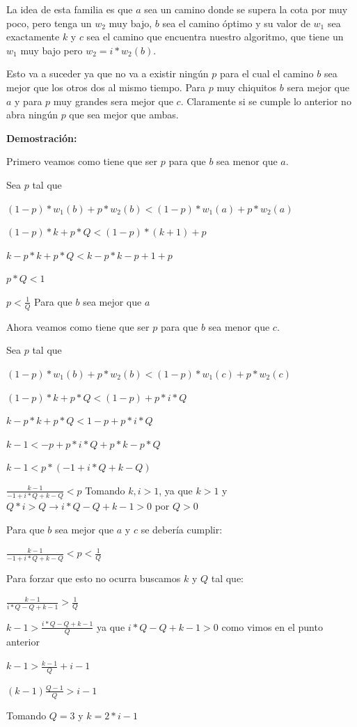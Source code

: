 La idea de esta familia es que $a$ sea un camino donde se supera la cota por muy poco, pero tenga un $w_2$ muy bajo, $b$ sea el camino óptimo y su valor de $w_1$ sea exactamente $k$ y $c$ sea el camino que encuentra nuestro algoritmo, que tiene un $w_1$ muy bajo pero $w_2 = i * w_2(b)$.

Esto va a suceder ya que no va a existir ningún $p$ para el cual el camino $b$ sea mejor que los otros dos al mismo tiempo. Para $p$ muy chiquitos $b$ sera mejor que $a$ y para $p$ muy grandes sera mejor que $c$. Claramente si se cumple lo anterior no abra ningún $p$ que sea mejor que ambas.

\textbf{Demostración:}

Primero veamos como tiene que ser $p$ para que $b$ sea menor que $a$.

Sea $p$ tal que 

$(1-p)*w_1(b)+p*w_2(b) < (1-p)*w_1(a)+p*w_2(a)$

$(1-p)*k+p*Q < (1-p)*(k+1)+p$

$k-p*k+p*Q < k-p*k-p+1+p$

$p*Q < 1$

$p < \frac{1}{Q}$ Para que $b$ sea mejor que $a$

Ahora veamos como tiene que ser $p$ para que $b$ sea menor que $c$.

Sea $p$ tal que 

$(1-p)*w_1(b)+p*w_2(b) < (1-p)*w_1(c)+p*w_2(c)$

$(1-p)*k+p*Q < (1-p)+p*i*Q$

$k-p*k+p*Q < 1-p+p*i*Q$

$k-1 < -p+p*i*Q+p*k-p*Q$

$k-1 < p*(-1+i*Q+k-Q)$

$\frac{k-1}{-1+i*Q+k-Q} < p$ Tomando $k,i > 1$, ya que $k > 1$ y $Q*i > Q \rightarrow i*Q-Q+k-1 > 0$ por $Q > 0$

Para que $b$ sea mejor que $a$ y $c$ se debería cumplir:

$\frac{k-1}{-1+i*Q+k-Q} < p < \frac{1}{Q}$

Para forzar que esto no ocurra buscamos $k$ y $Q$ tal que:

$\frac{k-1}{i*Q-Q+k-1} > \frac{1}{Q}$

$k-1 > \frac{i*Q-Q+k-1}{Q}$ ya que $i*Q-Q+k-1 > 0$ como vimos en el punto anterior

$k-1 > \frac{k-1}{Q}+i-1$

$(k-1) \frac{Q-1}{Q} > i-1$

Tomando $Q=3$ y $k=2*i-1$

